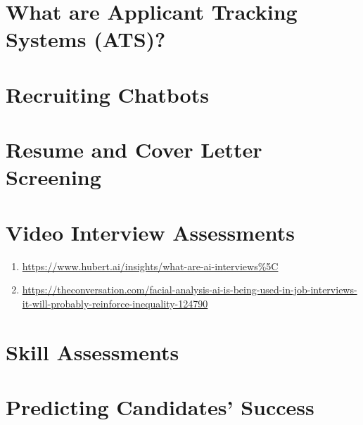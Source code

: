 \documentclass[
]{book}
\begin{document}
\hypertarget{what-are-applicant-tracking-systems-ats-1}{%
\section{What are Applicant Tracking Systems (ATS)?}\label{what-are-applicant-tracking-systems-ats-1}}

\hypertarget{recruiting-chatbots-1}{%
\section{Recruiting Chatbots}\label{recruiting-chatbots-1}}

\hypertarget{resume-and-cover-letter-screening-1}{%
\section{Resume and Cover Letter Screening}\label{resume-and-cover-letter-screening-1}}

\hypertarget{video-interview-assessments-1}{%
\section{Video Interview Assessments}\label{video-interview-assessments-1}}

\begin{enumerate}
\def\labelenumi{(\arabic{enumi})}
\item
  \url{https://www.hubert.ai/insights/what-are-ai-interviews\%5C}
\item
  \url{https://theconversation.com/facial-analysis-ai-is-being-used-in-job-interviews-it-will-probably-reinforce-inequality-124790}
\end{enumerate}

\hypertarget{skill-assessments-1}{%
\section{Skill Assessments}\label{skill-assessments-1}}

\hypertarget{predicting-candidates-success-1}{%
\section{Predicting Candidates' Success}\label{predicting-candidates-success-1}}

  
\end{document}
